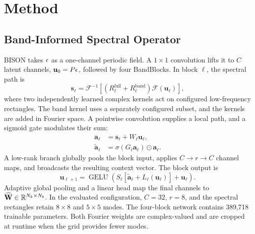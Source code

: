 
\section{Method}

\subsection{Band-Informed Spectral Operator}

BISON takes \(\epsilon\) as a one-channel periodic field. A
\(1\times1\) convolution lifts it to \(C\) latent channels,
\(\mathbf{u}_0=P\epsilon\), followed by four BandBlocks. In block
\(\ell\), the spectral path is
\begin{equation}
  \mathbf{s}_{\ell}=\mathcal{F}^{-1}\!\left[
  \left(R^{\mathrm{full}}_{\ell}+R^{\mathrm{band}}_{\ell}\right)
  \mathcal{F}(\mathbf{u}_{\ell})\right],
  \label{eq:dual-spectral}
\end{equation}
where two independently learned complex kernels act on configured
low-frequency rectangles. The band kernel uses a separately configured subset,
and the kernels are added in Fourier space. A pointwise convolution supplies a
local path, and a sigmoid gate modulates their sum:
\begin{align}
  \mathbf{a}_{\ell}&=\mathbf{s}_{\ell}+W_{\ell}\mathbf{u}_{\ell},\\
  \widetilde{\mathbf{a}}_{\ell}
  &=\sigma(G_{\ell}\mathbf{a}_{\ell})\odot\mathbf{a}_{\ell}.
\end{align}
A low-rank branch globally pools the block input, applies
\(C\rightarrow r\rightarrow C\) channel maps, and broadcasts the resulting
context vector. The block output is
\begin{equation}
  \mathbf{u}_{\ell+1}=\operatorname{GELU}\!\left(
  S_{\ell}[\widetilde{\mathbf{a}}_{\ell}+L_{\ell}(\mathbf{u}_{\ell})]
  +\mathbf{u}_{\ell}\right).
  \label{eq:bandblock}
\end{equation}
Adaptive global pooling and a linear head map the final channels to
\(\widehat{\mathbf{W}}\in\mathbb{R}^{N_k\times N_b}\). In the evaluated configuration,
\(C=32\), \(r=8\), and the spectral rectangles retain \(8\times8\) and
\(5\times5\) modes. The four-block network contains 389,718 trainable
parameters. Both Fourier weights are complex-valued and are cropped at runtime
when the grid provides fewer modes.

